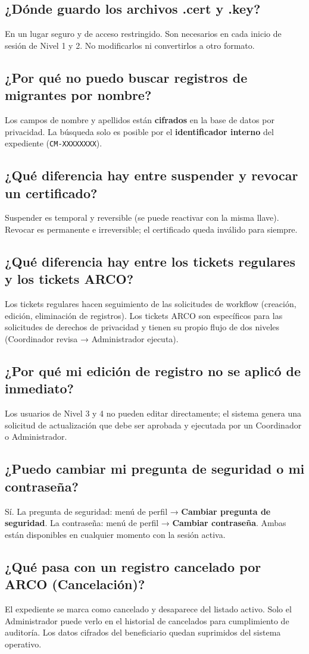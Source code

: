 \documentclass[10pt,letterpaper]{report}
\begin{document}
\subsection*{¿Dónde guardo los archivos .cert y .key?}
En un lugar seguro y de acceso restringido. Son necesarios en cada inicio de sesión de Nivel 1 y 2. No modificarlos ni convertirlos a otro formato.

\subsection*{¿Por qué no puedo buscar registros de migrantes por nombre?}
Los campos de nombre y apellidos están \textbf{cifrados} en la base de datos por privacidad. La búsqueda solo es posible por el \textbf{identificador interno} del expediente (\texttt{CM-XXXXXXXX}).

\subsection*{¿Qué diferencia hay entre suspender y revocar un certificado?}
Suspender es temporal y reversible (se puede reactivar con la misma llave). Revocar es permanente e irreversible; el certificado queda inválido para siempre.

\subsection*{¿Qué diferencia hay entre los tickets regulares y los tickets ARCO?}
Los tickets regulares hacen seguimiento de las solicitudes de workflow (creación, edición, eliminación de registros). Los tickets ARCO son específicos para las solicitudes de derechos de privacidad y tienen su propio flujo de dos niveles (Coordinador revisa → Administrador ejecuta).

\subsection*{¿Por qué mi edición de registro no se aplicó de inmediato?}
Los usuarios de Nivel 3 y 4 no pueden editar directamente; el sistema genera una solicitud de actualización que debe ser aprobada y ejecutada por un Coordinador o Administrador.

\subsection*{¿Puedo cambiar mi pregunta de seguridad o mi contraseña?}
Sí. La pregunta de seguridad: menú de perfil → \textbf{Cambiar pregunta de seguridad}. La contraseña: menú de perfil → \textbf{Cambiar contraseña}. Ambas están disponibles en cualquier momento con la sesión activa.

\subsection*{¿Qué pasa con un registro cancelado por ARCO (Cancelación)?}
El expediente se marca como cancelado y desaparece del listado activo. Solo el Administrador puede verlo en el historial de cancelados para cumplimiento de auditoría. Los datos cifrados del beneficiario quedan suprimidos del sistema operativo.
\end{document}
